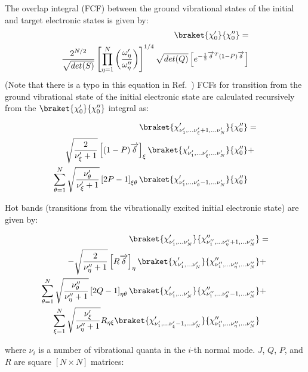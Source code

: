 \documentclass[11pt]{article}
\begin{document}
The overlap integral (FCF) between the ground vibrational states of the initial and target electronic states is
given by\cite{Duschinsky:math:98}:
\begin{align}
\braket{\chi'_0}{\chi''_0}=&\nonumber\\
\frac{2^{N/2}}{\sqrt{det(S)}}
\left[ \prod_{\eta=1}^{N} \left(\frac{\omega'_{\eta}}{\omega''_{\eta}}\right)  \right]^{1/4}
\sqrt{det(Q)}
\left[e^{-\frac{1}{2}\overrightarrow{\delta}^T(1-P)\overrightarrow{\delta}} \right]&
\end{align}
(Note that there is a typo in this equation in Ref.~\cite{Duschinsky:math:98})
FCFs for transition from the ground vibrational state of the initial electronic 
state are calculated recursively\cite{Duschinsky:math:98} from the 
$\braket{\chi'_0}{\chi''_0}$ integral as:

\begin{align}
\braket{ \chi'_{\nu'_1,...\nu'_{\xi}+1,...\nu'_N} }{\chi''_0}&=\nonumber\\
\sqrt{\frac{2}{\nu'_{\xi}+1}} \left[ (1-P)\overrightarrow{\delta}\right]_{\xi} 
\braket{ \chi'_{\nu'_1,...\nu'_{\xi},...\nu'_N} }{\chi''_0}&+\nonumber\\
\sum_{\theta=1}^{N} \sqrt{\frac{\nu'_{\theta}}{\nu'_{\xi}+1}}  \left[ 2P-1\right]_{\xi\theta}
\braket{ \chi'_{\nu'_1,...\nu'_{\theta}-1,...\nu'_N} }{\chi''_0}&
\end{align}

Hot bands (transitions from the vibrationally excited initial electronic state) are 
given by:

\begin{align}
\braket{ \chi'_{\nu'_1,...\nu'_N} }{ \chi''_{\nu''_1,...\nu''_{\eta}+1,...\nu''_N} }&=\nonumber\\
-\sqrt{\frac{2}{\nu''_{\eta}+1}} \left[ R\overrightarrow{\delta} \right]_{\eta}
\braket{ \chi'_{\nu'_1,...\nu'_N} }{ \chi''_{\nu''_1,...\nu''_{\eta},...\nu''_N} }&+\nonumber\\
\sum_{\theta=1}^{N}   \sqrt{ \frac{\nu''_{\theta}}{\nu''_{\eta}+1} }   \left[ 2Q-1 \right]_{\eta\theta}
\braket{ \chi'_{\nu'_1,...\nu'_N} }{ \chi''_{\nu''_1,...\nu''_{\theta}-1,...\nu''_N} }&+\nonumber\\
\sum_{\xi=1}^{N}   \sqrt{ \frac{\nu'_{\xi}}{\nu''_{\eta}+1} }   R_{\eta\xi}
\braket{ \chi'_{\nu'_1,...\nu'_{\xi}-1,...\nu'_N} }{ \chi''_{\nu''_1,...\nu''_{\eta},...\nu''_N} }&
\end{align}

where $\nu_i$ is a number of vibrational quanta in the $i$-th normal mode.
$J$, $Q$, $P$, and $R$ are square $[N\times N]$ matrices:
\end{document}
